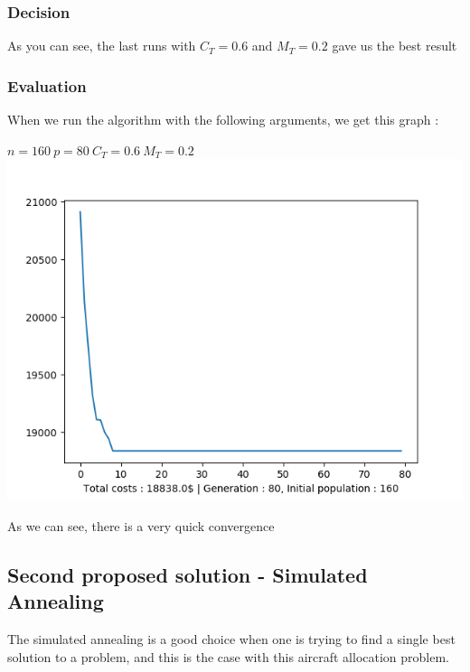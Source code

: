 \documentclass[11pt]{article}
\begin{document}
\hypertarget{decision}{%
\subsubsection{Decision}\label{decision}}

As you can see, the last runs with \(C_{T}=0.6\) and \(M_{T}=0.2\) gave
us the best result

\hypertarget{evaluation}{%
\subsubsection{Evaluation}\label{evaluation}}

When we run the algorithm with the following arguments, we get this
graph :

\begin{center}
\(n = 160\ p = 80\ C_{T}=0.6\ M_{T}=0.2\)
\includegraphics{image_genetic_airplane_3}
\end{center}

As we can see, there is a very quick convergence

    \hypertarget{second-proposed-solution---simulated-annealing}{%
\subsection{Second proposed solution - Simulated
Annealing}\label{second-proposed-solution---simulated-annealing}}

The simulated annealing is a good choice when one is trying to find a
single best solution to a problem, and this is the case with this
aircraft allocation problem.
\end{document}
